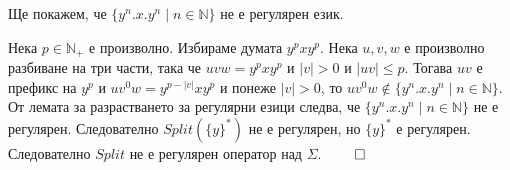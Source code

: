 \documentclass[12pt]{article}
\begin{document}
Ще покажем, че \(\{y^n.x.y^n \mid n \in \mathbb{N}\}\) не е регулярен език.

Нека \(p \in \mathbb{N}_+\) е произволно.
Избираме думата \(y^pxy^p\).
Нека \(u, v, w\) е произволно разбиване на три части, така че
\(uvw = y^pxy^p\) и \(|v| > 0\) и \(|uv| \leq p\). Тогава \(uv\) е префикс на \(y^p\) и 
\(uv^0w = y^{p - |v|}xy^p\) и понеже \(|v| > 0 \), то \(uv^0w \notin \{y^n.x.y^n \mid n \in \mathbb{N}\}\).
От лемата за разрастването за регулярни езици следва, че \(\{y^n.x.y^n \mid n \in \mathbb{N}\}\) не е регулярен.
Следователно \(Split(\{y\}^*)\) не е регулярен, но \(\{y\}^*\) е регулярен.
Следователно \(Split\) не е регулярен оператор над \(\Sigma\). \(\qed\)
\end{document}
